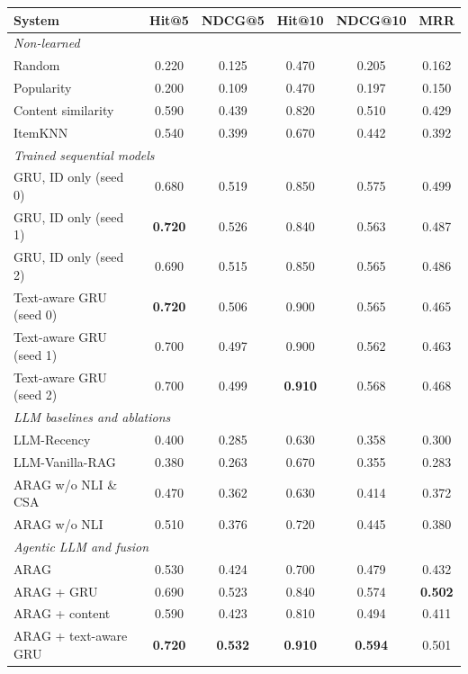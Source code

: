 \begin{tabular}{lccccc}
\toprule
System & Hit@5 & NDCG@5 & Hit@10 & NDCG@10 & MRR \\
\midrule
\multicolumn{6}{l}{\textit{Non-learned}} \\
\quad Random & 0.220 & 0.125 & 0.470 & 0.205 & 0.162 \\
\quad Popularity & 0.200 & 0.109 & 0.470 & 0.197 & 0.150 \\
\quad Content similarity & 0.590 & 0.439 & 0.820 & 0.510 & 0.429 \\
\quad ItemKNN & 0.540 & 0.399 & 0.670 & 0.442 & 0.392 \\
\midrule
\multicolumn{6}{l}{\textit{Trained sequential models}} \\
\quad GRU, ID only (seed 0) & 0.680 & 0.519 & 0.850 & 0.575 & 0.499 \\
\quad GRU, ID only (seed 1) & \textbf{0.720} & 0.526 & 0.840 & 0.563 & 0.487 \\
\quad GRU, ID only (seed 2) & 0.690 & 0.515 & 0.850 & 0.565 & 0.486 \\
\quad Text-aware GRU (seed 0) & \textbf{0.720} & 0.506 & 0.900 & 0.565 & 0.465 \\
\quad Text-aware GRU (seed 1) & 0.700 & 0.497 & 0.900 & 0.562 & 0.463 \\
\quad Text-aware GRU (seed 2) & 0.700 & 0.499 & \textbf{0.910} & 0.568 & 0.468 \\
\midrule
\multicolumn{6}{l}{\textit{LLM baselines and ablations}} \\
\quad LLM-Recency & 0.400 & 0.285 & 0.630 & 0.358 & 0.300 \\
\quad LLM-Vanilla-RAG & 0.380 & 0.263 & 0.670 & 0.355 & 0.283 \\
\quad ARAG w/o NLI \& CSA & 0.470 & 0.362 & 0.630 & 0.414 & 0.372 \\
\quad ARAG w/o NLI & 0.510 & 0.376 & 0.720 & 0.445 & 0.380 \\
\midrule
\multicolumn{6}{l}{\textit{Agentic LLM and fusion}} \\
\quad ARAG & 0.530 & 0.424 & 0.700 & 0.479 & 0.432 \\
\quad ARAG + GRU & 0.690 & 0.523 & 0.840 & 0.574 & \textbf{0.502} \\
\quad ARAG + content & 0.590 & 0.423 & 0.810 & 0.494 & 0.411 \\
\quad ARAG + text-aware GRU & \textbf{0.720} & \textbf{0.532} & \textbf{0.910} & \textbf{0.594} & 0.501 \\
\bottomrule
\end{tabular}
